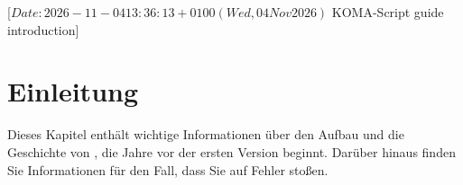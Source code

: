 %
%
%
%
%
%
%

                 [$Date: 2026-11-04 13:36:13 +0100 (Wed, 04 Nov 2026) $
                  KOMA-Script guide introduction]

\chapter{Einleitung}

Dieses Kapitel enthält wichtige Informationen über
den Aufbau  und die Geschichte von
\KOMAScript, die Jahre vor der ersten Version beginnt. Darüber hinaus finden
Sie Informationen für den Fall, dass Sie %
%
auf Fehler stoßen.

